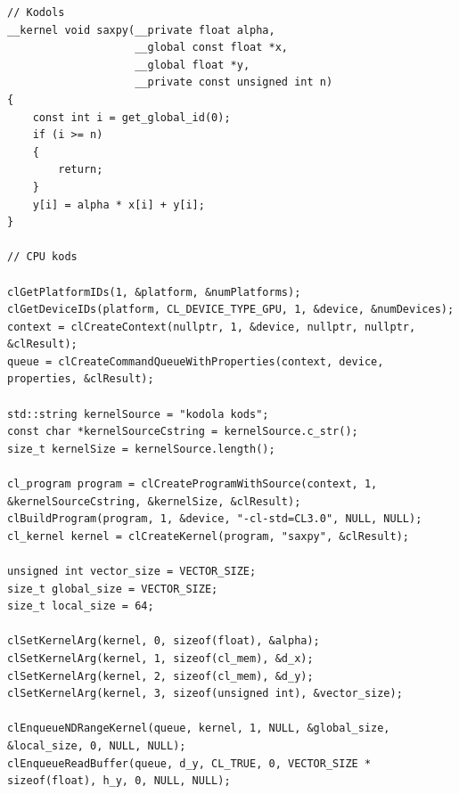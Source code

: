\begin{lstlisting}[caption={OpenCL GPGPU kodols un izsaukšana no C++},
  label=lst:opencl_kernel_exec,
  captionpos=t
]
// Kodols
__kernel void saxpy(__private float alpha,
                    __global const float *x,
                    __global float *y,
                    __private const unsigned int n)
{
    const int i = get_global_id(0);
    if (i >= n)
    {
        return;
    }
    y[i] = alpha * x[i] + y[i];
}

// CPU kods

clGetPlatformIDs(1, &platform, &numPlatforms);
clGetDeviceIDs(platform, CL_DEVICE_TYPE_GPU, 1, &device, &numDevices);
context = clCreateContext(nullptr, 1, &device, nullptr, nullptr, &clResult);
queue = clCreateCommandQueueWithProperties(context, device, properties, &clResult);

std::string kernelSource = "kodola kods";
const char *kernelSourceCstring = kernelSource.c_str();
size_t kernelSize = kernelSource.length();

cl_program program = clCreateProgramWithSource(context, 1, &kernelSourceCstring, &kernelSize, &clResult);
clBuildProgram(program, 1, &device, "-cl-std=CL3.0", NULL, NULL);
cl_kernel kernel = clCreateKernel(program, "saxpy", &clResult);

unsigned int vector_size = VECTOR_SIZE;
size_t global_size = VECTOR_SIZE;
size_t local_size = 64;

clSetKernelArg(kernel, 0, sizeof(float), &alpha);
clSetKernelArg(kernel, 1, sizeof(cl_mem), &d_x);
clSetKernelArg(kernel, 2, sizeof(cl_mem), &d_y);
clSetKernelArg(kernel, 3, sizeof(unsigned int), &vector_size);

clEnqueueNDRangeKernel(queue, kernel, 1, NULL, &global_size, &local_size, 0, NULL, NULL);
clEnqueueReadBuffer(queue, d_y, CL_TRUE, 0, VECTOR_SIZE * sizeof(float), h_y, 0, NULL, NULL);
\end{lstlisting}

